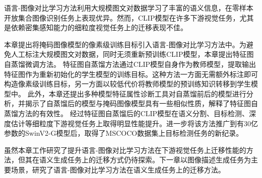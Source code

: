 
语言-图像对比学习方法利用大规模图文对数据学习了丰富的语义信息，在零样本开放集合图像识别任务上表现优异。然而，CLIP模型在许多下游视觉任务，尤其是依赖密集感知能力的细粒度视觉任务上的迁移表现不佳。

本章提出将掩码图像模型的像素级训练目标引入语言-图像对比学习方法中。为避免人工标注大规模图文对数据，同时无须重新预训练CLIP模型，本章提出特征图自蒸馏微调方法。
特征图自蒸馏方法通过CLIP模型自身作为教师模型，提取输出特征图作为重新初始化的学生模型的训练目标。这种方法一方面无需额外标注即可构造像素级训练目标，另一方面以较低代价将教师模型的预训练知识转移到学生模型中。
此外，本章还提出多种模型特征属性诊断工具对自蒸馏前后的模型进行分析，并揭示了自蒸馏后的模型与掩码图像模型具有一些相似性质，解释了特征图自蒸馏方法的有效性。
经过特征图自蒸馏后的CLIP模型在语义分割、目标检测、深度估计等细粒度下游视觉任务上取得明显性能提升。进一步将该方法推广到有30亿参数的SwinV2-G模型后，取得了MSCOCO数据集上目标检测任务的新纪录。

虽然本章工作研究了提升语言-图像对比学习方法在下游视觉任务上迁移性能的方法，但其在语义生成任务上的迁移方式仍待探索。下一章以图像描述生成任务为主要场景，研究了语言-图像对比学习方法在语义生成任务上的迁移方法。